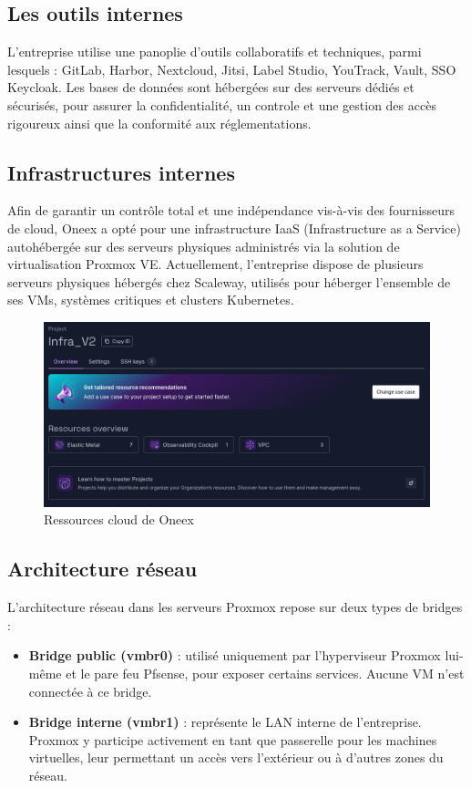 \subsection{Les outils internes}

L’entreprise utilise une panoplie d'outils collaboratifs et techniques, parmi lesquels :
GitLab, Harbor, Nextcloud, Jitsi, Label Studio, YouTrack, Vault, SSO Keycloak.
Les bases de données sont hébergées sur des serveurs dédiés et sécurisés, pour assurer la confidentialité, un controle et une gestion des accès rigoureux ainsi que la conformité aux réglementations.

\subsection{Infrastructures internes}

Afin de garantir un contrôle total et une indépendance vis-à-vis des fournisseurs de cloud, Oneex a opté pour une infrastructure IaaS (Infrastructure as a Service) autohébergée sur des serveurs physiques administrés via la solution de virtualisation Proxmox VE.
Actuellement, l'entreprise dispose de plusieurs serveurs physiques hébergés chez Scaleway, utilisés pour héberger l’ensemble de ses VMs, systèmes critiques et clusters Kubernetes.

\begin{figure} [H]
	\centering
	\includegraphics[width=.5\textwidth]{figures/Ressources cloud.png}
	\caption{Ressources cloud de Oneex}
\end{figure}

\subsection{Architecture réseau}

L’architecture réseau dans les serveurs Proxmox repose sur deux types de bridges :

\begin{itemize}
	\item \textbf{Bridge public (vmbr0)} : utilisé uniquement par l’hyperviseur Proxmox lui-même et le pare feu Pfsense, pour exposer certains services. Aucune VM n’est connectée à ce bridge.
	\item \textbf{Bridge interne (vmbr1)} : représente le LAN interne de l’entreprise. Proxmox y participe activement en tant que passerelle pour les machines virtuelles, leur permettant un accès vers l’extérieur ou à d’autres zones du réseau.
\end{itemize}

